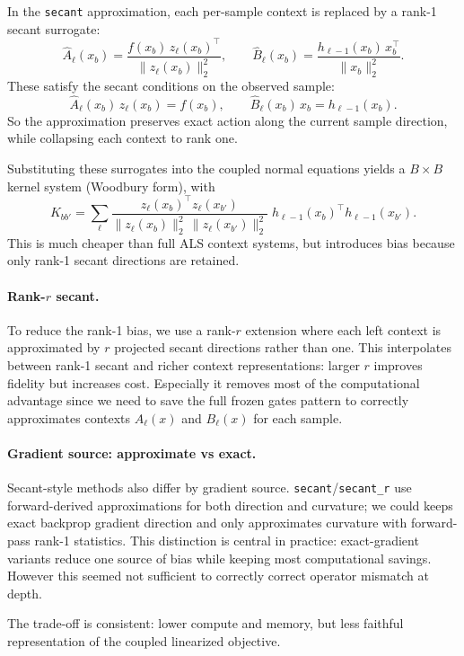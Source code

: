\documentclass{article}
\begin{document}
In the \texttt{secant} approximation, each per-sample context is replaced by
a rank-1 secant surrogate:
\[
\widehat A_\ell(x_b)
=
\frac{f(x_b)\,z_\ell(x_b)^\top}{\|z_\ell(x_b)\|_2^2},
\qquad
\widehat B_\ell(x_b)
=
\frac{h_{\ell-1}(x_b)\,x_b^\top}{\|x_b\|_2^2}.
\]
These satisfy the secant conditions on the observed sample:
\[
\widehat A_\ell(x_b)\,z_\ell(x_b)=f(x_b),
\qquad
\widehat B_\ell(x_b)\,x_b=h_{\ell-1}(x_b).
\]
So the approximation preserves exact action along the current sample direction,
while collapsing each context to rank one.

Substituting these surrogates into the coupled normal equations yields a
$B\times B$ kernel system (Woodbury form), with
\[
K_{bb'}
=
\sum_{\ell}
\frac{z_\ell(x_b)^\top z_\ell(x_{b'})}{
\|z_\ell(x_b)\|_2^2\,\|z_\ell(x_{b'})\|_2^2}
\;h_{\ell-1}(x_b)^\top h_{\ell-1}(x_{b'}).
\]
This is much cheaper than full ALS context systems, but introduces bias because
only rank-1 secant directions are retained.


\paragraph{Rank-$r$ secant.}
To reduce the rank-1 bias, we use a rank-$r$ extension where each left context
is approximated by $r$ projected secant directions rather than one.
This interpolates between rank-1 secant and richer context representations:
larger $r$ improves fidelity but increases cost. Especially it removes most of the computational advantage since we need to save the full frozen gates pattern to correctly approximates contexts $A_\ell(x)$ and $B_\ell(x)$ for each sample.

\paragraph{Gradient source: approximate vs exact.}
Secant-style methods also differ by gradient source.
\texttt{secant}/\texttt{secant\_r} use forward-derived approximations for both
direction and curvature; we could keeps exact backprop gradient direction
and only approximates curvature with forward-pass rank-1 statistics.
This distinction is central in practice: exact-gradient variants reduce one
source of bias while keeping most computational savings. However this seemed not sufficient to correctly correct operator mismatch at depth.

The trade-off is consistent: lower compute and memory, but less
faithful representation of the coupled linearized objective.
\end{document}

